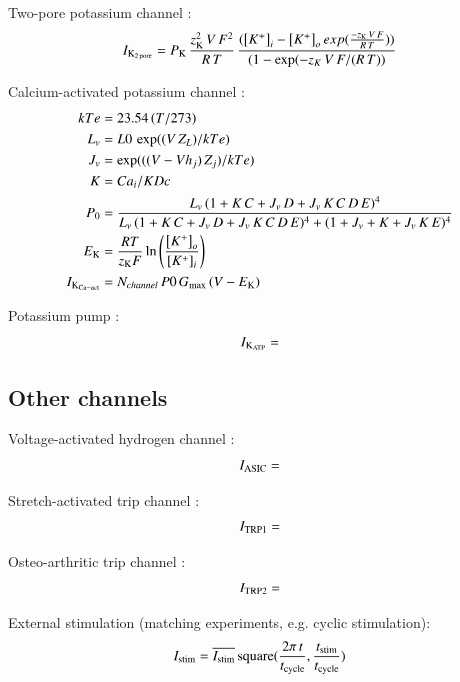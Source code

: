 Two-pore potassium channel \citep{UNKNOWN}:
\begin{equation}
 I_{\rm K_{2\, pore}} = P_{\rm K}\, \frac{z_{\rm K}^2\, V\, F^{2}}{R\,
   T}\, \frac{({\left[K^{+}\right]_{i}} - {\left[K^{+}\right]_{o}}\,
 exp(\frac{-z_{\rm K}\, V\, F}{R\, T}))}{(1 - \exp(-z_K\, V\, F/(R\,
 T))}
\end{equation}

Calcium-activated potassium channel \citep{Horriganetal2002}:
\begin{equation}
  \begin{split}
    kTe & = 23.54\, (T/273)\\
    L_v & = L0\, \exp((V\, Z_L)/kTe)\\
    J_v & = \exp(((V - Vh_j)\, Z_j)/kTe)\\
    K & = Ca_i/KDc\\
    P_0 & = \frac{L_v\, (1+K\, C+J_v\, D+J_v\, K\, C\, D\, E)^4}
    {L_v\, (1+K\, C+J_v\, D+J_v\, K\, C\, D\, E)^4 +
      (1+J_v+K+J_v\, K\, E)^4}\\
    E_{\rm K} & =  \frac{R T}{z_{\rm K} F}
    \ln\left(\frac{\left[K^{+}\right]_{o}}
      {\left[K^{+}\right]_{i}}\right)\\
    I_{\rm K_{Ca-act}} & = N_{channel}\, P0\, G_{\rm max}\, (V -
    E_{\rm K})
  \end{split}
\end{equation}

Potassium pump \citep{UNKNOWN}:
\begin{equation}
  I_{\rm K_{ATP}} =
\end{equation}

\subsection{Other channels}
\label{sec:other-channels}


Voltage-activated hydrogen channel \citep{UNKNOWN}:
\begin{equation}
  I_{\rm ASIC} =
\end{equation}

Stretch-activated trip channel \citep{UNKNOWN}:
\begin{equation}
  I_{\rm TRP1} =
\end{equation}

Osteo-arthritic trip channel \citep{UNKNOWN}:
\begin{equation}
  I_{\rm TRP2} =
\end{equation}

External stimulation (matching experiments, e.g. cyclic stimulation):
\begin{equation}
I_{\rm stim} = \overline{I_{\rm stim}}\, {\rm square}(\frac{2 \pi\,
  t}{t_{\rm cycle}}, \frac{t_{\rm stim}}{t_{\rm cycle}})
\end{equation}

